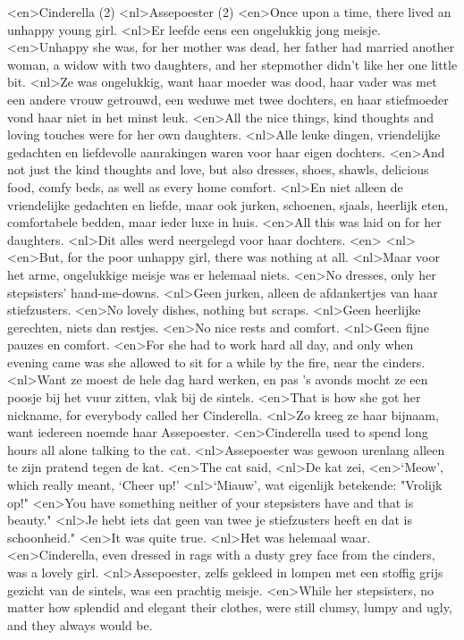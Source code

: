 <en>Cinderella (2)
<nl>Assepoester (2)
<en>Once upon a time, there lived an unhappy young girl.
<nl>Er leefde eens een ongelukkig jong meisje.
<en>Unhappy she was, for her mother was dead, her father had married another woman, a widow with two daughters, and her stepmother didn’t like her one little bit.
<nl>Ze was ongelukkig, want haar moeder was dood, haar vader was met een andere vrouw getrouwd, een weduwe met twee dochters, en haar stiefmoeder vond haar niet in het minst leuk.
<en>All the nice things, kind thoughts and loving touches were for her own daughters.
<nl>Alle leuke dingen, vriendelijke gedachten en liefdevolle aanrakingen waren voor haar eigen dochters.
<en>And not just the kind thoughts and love, but also dresses, shoes, shawls, delicious food, comfy beds, as well as every home comfort.
<nl>En niet alleen de vriendelijke gedachten en liefde, maar ook jurken, schoenen, sjaals, heerlijk eten, comfortabele bedden, maar ieder luxe in huis.
<en>All this was laid on for her daughters.
<nl>Dit alles werd neergelegd voor haar dochters.
<en>
<nl>
<en>But, for the poor unhappy girl, there was nothing at all.
<nl>Maar voor het arme, ongelukkige meisje was er helemaal niets.
<en>No dresses, only her stepsisters’ hand-me-downs.
<nl>Geen jurken, alleen de afdankertjes van haar stiefzusters.
<en>No lovely dishes, nothing but scraps.
<nl>Geen heerlijke gerechten, niets dan restjes.
<en>No nice rests and comfort.
<nl>Geen fijne pauzes en comfort.
<en>For she had to work hard all day, and only when evening came was she allowed to sit for a while by the fire, near the cinders.
<nl>Want ze moest de hele dag hard werken, en pas 's avonds mocht ze een poosje bij het vuur zitten, vlak bij de sintels.
<en>That is how she got her nickname, for everybody called her Cinderella.
<nl>Zo kreeg ze haar bijnaam, want iedereen noemde haar Assepoester.
<en>Cinderella used to spend long hours all alone talking to the cat.
<nl>Assepoester was gewoon urenlang alleen te zijn  pratend tegen de kat.
<en>The cat said,
<nl>De kat zei,
<en>`Meow', which really meant, `Cheer up!'
<nl>`Miauw', wat eigenlijk betekende: "Vrolijk op!"
<en>You have something neither of your stepsisters have and that is beauty."
<nl>Je hebt iets dat geen van twee je stiefzusters heeft en dat is schoonheid."
<en>It was quite true.
<nl>Het was helemaal waar.
<en>Cinderella, even dressed in rags with a dusty grey face from the cinders, was a lovely girl.
<nl>Assepoester, zelfs gekleed in lompen met een stoffig grijs gezicht van de sintels, was een prachtig meisje.
<en>While her stepsisters, no matter how splendid and elegant their clothes, were still clumsy, lumpy and ugly, and they always would be.
